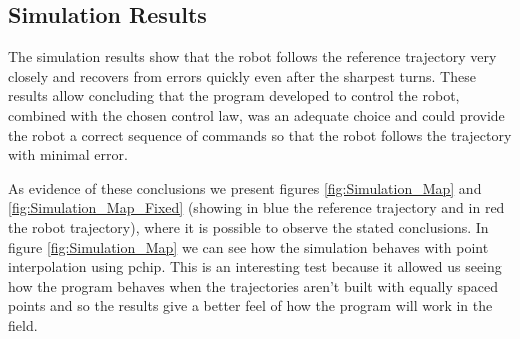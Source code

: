 \documentclass[11pt,a4paper]{scrartcl}
\begin{document}
\subsection{Simulation Results}
The simulation results show that the robot follows the reference trajectory very closely and recovers from errors quickly even after the sharpest turns. These results allow concluding that the program developed to control the robot, combined with the chosen control law, was an adequate choice and could provide the robot a correct sequence of commands so that the robot follows the trajectory with minimal error.

As evidence of these conclusions we present figures \ref{fig:Simulation_Map} and \ref{fig:Simulation_Map_Fixed} (showing in blue the reference trajectory and in red the robot trajectory), where it is possible to observe the stated conclusions. In figure \ref{fig:Simulation_Map} we can see how the simulation behaves with point interpolation using pchip. This is an interesting test because it allowed us seeing how the program behaves when the trajectories aren't built with equally spaced points and so the results give a better feel of how the program will work in the field.
\end{document}
